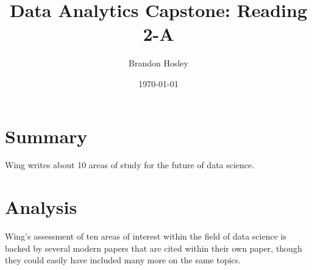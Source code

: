 \documentclass[]{article}
\title{Data Analytics Capstone: Reading 2-A}
\author{Brandon Hosley}
\date{\today}
\begin{document}
	\maketitle
	
\section{Summary} 

Wing \cite{Wing2020} writes about 10 areas of study for the future of data science.


\section{Analysis}

Wing's assessment of ten areas of interest within the field of data science is backed by several modern papers that are cited within their own paper, though they could easily have included many more on the same topics.


\clearpage


\end{document}
